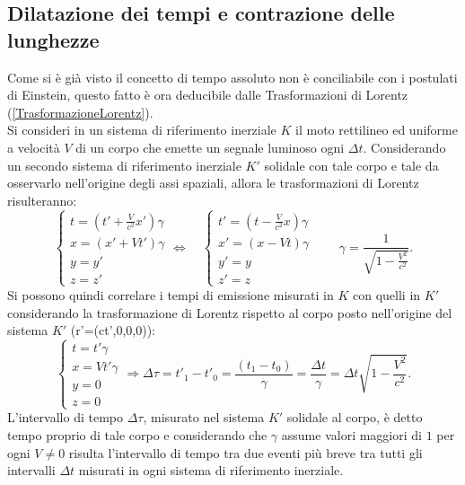 \subsection{Dilatazione dei tempi e contrazione delle lunghezze}\label{sec:ContrazioneDilatazione}
Come si è già visto il concetto di tempo assoluto non è conciliabile con i postulati di Einstein, questo fatto è ora deducibile dalle Trasformazioni di Lorentz (\ref{TrasformazioneLorentz}).\\
Si consideri in un sistema di riferimento inerziale $K$ il moto rettilineo ed uniforme a velocità $V$ di un corpo che emette un segnale luminoso ogni $\Delta t$. Considerando un secondo sistema di riferimento inerziale $K'$ solidale con tale corpo e tale da osservarlo nell'origine degli assi spaziali, allora le trasformazioni di Lorentz risulteranno:
\begin{equation*}
    \begin{cases}
        t=(t'+\frac{V}{c^2}x')\gamma\\
        x=(x'+Vt')\gamma\\
        y=y'\\
        z=z'
    \end{cases}
    \Longleftrightarrow \quad
    \begin{cases}
        t'=(t-\frac{V}{c^2}x)\gamma\\
        x'=(x-Vt)\gamma\\
        y'=y\\
        z'=z
    \end{cases}
    \qquad \gamma=\frac{1}{\sqrt{1-\frac{V^2}{c^2}}}.
\end{equation*}
Si possono quindi correlare i tempi di emissione misurati in $K$ con quelli in $K'$ considerando la trasformazione di Lorentz rispetto al corpo posto nell'origine del sistema $K'$ (r'=(ct',0,0,0)): 
\begin{equation}
    \begin{cases}
        t=t'\gamma\\
        x=Vt'\gamma\\
        y=0\\
        z=0
    \end{cases}
    \Rightarrow \Delta \tau=t'_1-t'_0=\frac{(t_1-t_0)}{\gamma}=\frac{\Delta t}{\gamma}=\Delta t \sqrt{1-\frac{V^2}{c^2}}.
    \label{dilatazioneTempi}
\end{equation}
L'intervallo di tempo $\Delta \tau$, misurato nel sistema $K'$ solidale al corpo, è detto tempo proprio di tale corpo e considerando che $\gamma$ assume valori maggiori di $1$ per ogni $V\neq 0$ risulta l'intervallo di tempo tra due eventi più breve tra tutti gli intervalli $\Delta t$ misurati in ogni sistema di riferimento inerziale.\\

